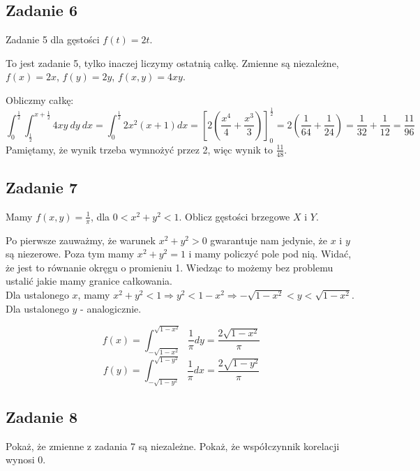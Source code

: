 \documentclass[a4paper]{article}
\begin{document}
\subsection*{Zadanie 6}
Zadanie 5 dla gęstości $f(t)=2t$.

To jest zadanie 5, tylko inaczej liczymy ostatnią całkę. Zmienne są niezależne, $f(x)=2x$, $f(y)=2y$, $f(x,y)=4xy$.

Obliczmy całkę:
$$\int_0^\frac{1}{2} \int_\frac{1}{2}^{x+\frac{1}{2}} 4xy\ dy\ dx = \int_0^\frac{1}{2} 2x^2(x+1) dx =\left[ 2\left(\frac{x^4}{4} + \frac{x^3}{3}\right) \right]_0^\frac{1}{2}  = 2 \left( \frac{1}{64} + \frac{1}{24} \right) = \frac{1}{32} + \frac{1}{12} = \frac{11}{96}$$
Pamiętamy, że wynik trzeba wymnożyć przez 2, więc wynik to $\frac{11}{48}$.

\subsection*{Zadanie 7}
Mamy $f(x,y)=\frac{1}{\pi}$, dla $0<x^2+y^2<1$. Oblicz gęstości brzegowe $X$ i $Y$.

Po pierwsze zauważmy, że warunek $x^2+y^2>0$ gwarantuje nam jedynie, że $x$ i $y$ są niezerowe. Poza tym mamy $x^2+y^2=1$ i mamy policzyć pole pod nią. Widać, że jest to równanie okręgu o promieniu 1. Wiedząc to możemy bez problemu ustalić jakie mamy granice całkowania.\\
Dla ustalonego $x$, mamy $x^2+y^2<1 \Rightarrow y^2<1-x^2 \Rightarrow -\sqrt{1-x^2}<y<\sqrt{1-x^2}$. Dla ustalonego $y$ - analogicznie.

$$f(x)=\int_{-\sqrt{1-x^2}}^{\sqrt{1-x^2}} \frac{1}{\pi} dy = \frac{2\sqrt{1-x^2}}{\pi}$$
$$f(y)=\int_{-\sqrt{1-y^2}}^{\sqrt{1-y^2}} \frac{1}{\pi} dx = \frac{2\sqrt{1-y^2}}{\pi}$$

\subsection*{Zadanie 8}
Pokaż, że zmienne z zadania 7 są niezależne. Pokaż, że współczynnik korelacji wynosi 0.
\end{document}
